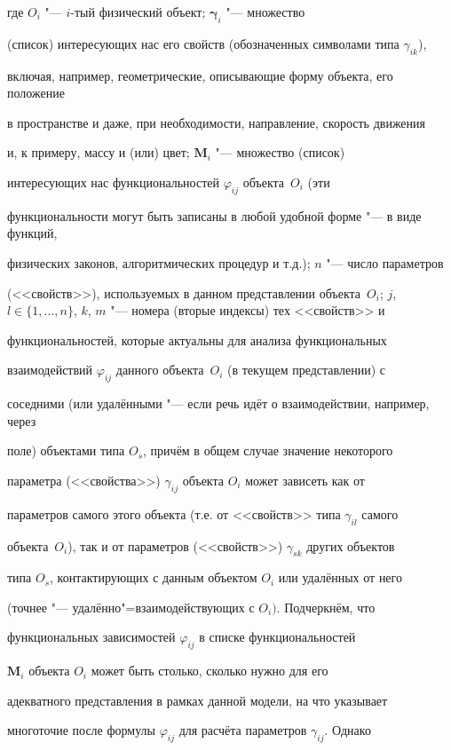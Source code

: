 где $O_i$ "--- $i$-тый физический объект; $\boldsymbol{\gamma}_i$ "--- множество

(список) интересующих нас его свойств (обозначенных символами типа $\gamma_{ik}$),

включая, например, геометрические, описывающие форму объекта, его положение

в пространстве и даже, при необходимости, направление, скорость движения

и, к примеру, массу и (или) цвет; $\mathbf{M}_i$ "--- множество (список)

интересующих нас функциональностей $\varphi_{ij}$ объекта~$O_i$ (эти

функциональности могут быть записаны в любой удобной форме "--- в виде функций,

физических законов, алгоритмических процедур и т.д.); $n$ "--- число параметров

(<<свойств>>), используемых в данном представлении объекта~$O_i$; $j$, $l\in

\{1,\ldots, n\}$, $k$, $m$ "--- номера (вторые индексы) тех <<свойств>> и

функциональностей, которые актуальны для анализа функциональных

взаимодействий $\varphi_{ij}$ данного объекта~$O_i$ (в текущем представлении) с

соседними (или удалёнными "--- если речь идёт о взаимодействии, например, через

поле) объектами типа $O_s$, причём в общем случае значение некоторого

параметра (<<свойства>>) $\gamma_{ij}$ объекта $O_i$ может зависеть как от

параметров самого этого объекта (т.е. от <<свойств>> типа $\gamma_{il}$ самого

объекта~$O_i$), так и от параметров (<<свойств>>) $\gamma_{sk}$ других объектов

типа $O_{s}$, контактирующих с данным объектом $O_{i}$ или удалённых от него

(точнее "--- удалённо"=взаимодействующих с $O_{i})$. Подчеркнём, что

функциональных зависимостей $\varphi_{ij}$ в списке функциональностей

$\mathbf{M}_i$ объекта $O_i$ может быть столько, сколько нужно для его

адекватного представления в рамках данной модели, на что указывает

многоточие после формулы $\varphi_{ij}$ для расчёта параметров $\gamma_{ij}$. Однако

